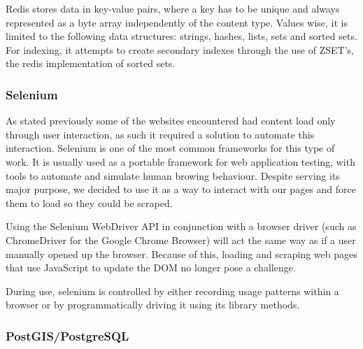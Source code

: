 Redis stores data in key-value pairs, where a key has to be unique and always represented as a byte array independently of the content type. Values wise, it is limited to the following data structures: strings, hashes, lists, sets and sorted sets. For indexing, it attempts to create secondary indexes through the use of ZSET's, the redis implementation of sorted sets.

\subsubsection{Selenium}
\label{sss:selenium}


As stated previously some of the websites encountered had content load only through user interaction, as such it required a solution to automate this interaction. Selenium is one of the most common frameworks for this type of work. It is usually used as a portable framework for web application testing, with tools to automate and simulate human browing behaviour. Despite serving its major purpose, we decided to use it as a way to interact with our pages and force them to load so they could be scraped.

Using the Selenium WebDriver API in conjunction with a browser driver (such as ChromeDriver for the Google Chrome Browser) will act the same way as if a user manually opened up the browser. Because of this, loading and scraping web pages that use JavaScript to update the DOM no longer pose a challenge.

During use, selenium is controlled by either recording usage patterns within a browser or by programmatically driving it using its library methods.

\subsubsection{PostGIS/PostgreSQL}
\label{ss:postgis}




